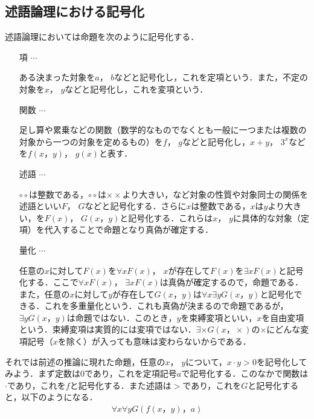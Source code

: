 \documentclass[10pt,b5paper,papersize,dvipdfmx]{jsbook}
\begin{document}
\subsection{述語論理における記号化}
述語論理においては命題を次のように記号化する． 
\begin{itemize}
\item[項]$\cdots$ \par
ある決まった対象を$a$， $b$などと記号化し，これを定項という．また，不定の対象を$x$， $y$などと記号化し，これを変項という． 
\item[関数]$\cdots$ \par
足し算や累乗などの関数（数学的なものでなくとも一般に一つまたは複数の対象から一つの対象を定めるもの）を$f$， $g$などと記号化し，$x+y$， $3^x$などを$f(x，y)$， $g(x)$と表す．
\item[述語]$\cdots$ \par
$\circ\circ$は整数である，$\circ\circ$は$\times\times$より大きい，など対象の性質や対象同士の関係を述語といい$F$， $G$などと記号化する．さらに$x$は整数である，$x$は$y$より大きい，を$F(x)$， $G(x，y)$と記号化する．これらは$x$， $y$に具体的な対象（定項）を代入することで命題となり真偽が確定する．
\item[量化]$\cdots$ \par
任意の$x$に対して$F(x)$を$\forall xF(x)$， $x$が存在して$F(x)$を$\exists xF(x)$と記号化する．ここで$\forall xF(x)$， $\exists xF(x)$は真偽が確定するので，命題である．また，任意の$x$に対して$y$が存在して$G(x，y)$は$\forall x\exists yG(x，y)$と記号化できる．これを多重量化という．これも真偽が決まるので命題であるが，$\exists yG(x，y)$は命題ではない．このとき，$y$を束縛変項といい，$x$を自由変項という．束縛変項は実質的には変項ではない．$\exists \times G(x，\times)$の$\times$にどんな変項記号（$x$を除く）が入っても意味は変わらないからである．
\end{itemize}
それでは前述の推論に現れた命題，任意の$x$， $y$について，$x\cdot y>0$を記号化してみよう．まず定数は$0$であり，これを定項記号$a$で記号化する．このなかで関数は$\cdot$であり，これを$f$と記号化する．また述語は$>$であり，これを$G$と記号化すると，以下のようになる．
\begin{align*}
\forall x\forall yG(f(x，y)，a)
\end{align*}
\end{document}
